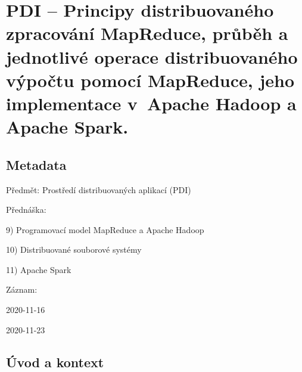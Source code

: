 

\graphicspath{{pdi/map_reduce}}


\chapter{PDI -- Principy distribuovaného zpracování MapReduce, průběh a jednotlivé operace distribuovaného výpočtu pomocí MapReduce, jeho implementace v~Apache Hadoop a Apache Spark.}


\section{Metadata}

\begin{compactitem}
    \item Předmět: Prostředí distribuovaných aplikací (PDI)
    \item Přednáška:
    \begin{compactitem}
        \item 9) Programovací model MapReduce a Apache Hadoop
        \item 10) Distribuované souborové systémy
        \item 11) Apache Spark
    \end{compactitem}
    \item Záznam:
    \begin{compactitem}
        \item 2020-11-16
        \item 2020-11-23
    \end{compactitem}
\end{compactitem}


\section{Úvod a kontext}


